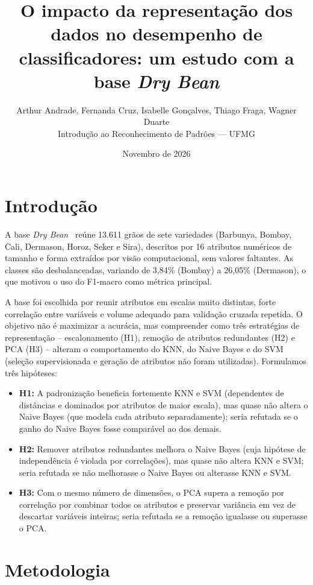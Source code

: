 \documentclass[11pt,a4paper]{article}
\title{O impacto da representação dos dados no desempenho de classificadores:
um estudo com a base \emph{Dry Bean}}
\author{Arthur Andrade, Fernanda Cruz, Isabelle Gonçalves, Thiago Fraga, Wagner Duarte\\
Introdução ao Reconhecimento de Padrões --- UFMG}
\date{Novembro de 2026}
\begin{document}
\maketitle

\section{Introdução}

A base \textit{Dry Bean}~\cite{koklu2020} reúne 13.611 grãos de sete variedades (Barbunya, Bombay, Cali, Dermason, Horoz, Seker e Sira), descritos por 16 
atributos numéricos de tamanho e forma extraídos por visão computacional, sem valores faltantes. As classes são desbalanceadas, variando de 3{,}84\% (Bombay) 
a 26{,}05\% (Dermason), o que motivou o uso do F1-macro como métrica principal.

A base foi escolhida por reunir atributos em escalas muito distintas, forte correlação entre variáveis e volume adequado para validação cruzada repetida. O 
objetivo não é maximizar a acurácia, mas compreender como três estratégias de representação -- escalonamento (H1), remoção de atributos redundantes (H2) e 
PCA (H3) -- alteram o comportamento do KNN, do Naive Bayes e do SVM (seleção supervisionada e geração de atributos não foram utilizadas). Formulamos três 
hipóteses:

\begin{itemize}
    \item \textbf{H1:} A padronização beneficia fortemente KNN e SVM (dependentes de distâncias e dominados por atributos de maior escala), mas quase não 
    altera o Naive Bayes (que modela cada atributo separadamente); seria refutada se o ganho do Naive Bayes fosse comparável ao dos demais.
    \item \textbf{H2:} Remover atributos redundantes melhora o Naive Bayes (cuja hipótese de independência é violada por correlações), mas quase não altera 
    KNN e SVM; seria refutada se não melhorasse o Naive Bayes ou alterasse KNN e SVM.
    \item \textbf{H3:} Com o mesmo número de dimensões, o PCA supera a remoção por correlação por combinar todos os atributos e preservar variância em vez 
    de descartar variáveis inteiras; seria refutada se a remoção igualasse ou superasse o PCA.
\end{itemize}

\section{Metodologia}
\end{document}
